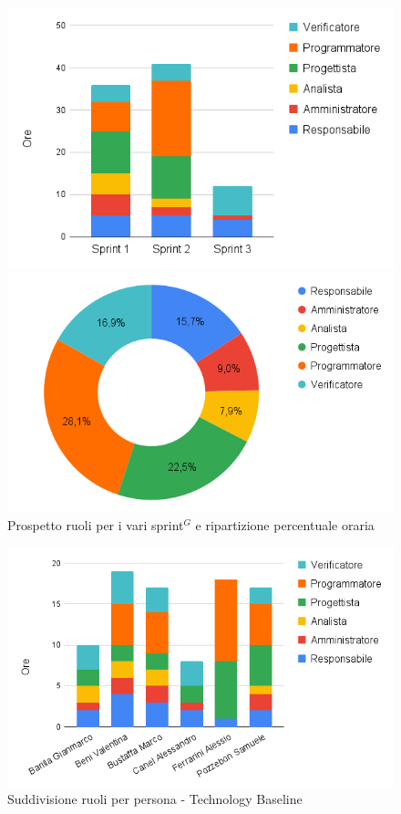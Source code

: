 \begin{figure}[h!]
	\centering
	\begin{minipage}[c]{0.3\textwidth}
    	\includegraphics[scale=0.46]{../../assets/Diagrammi_Excel/sprint_tec.png}
	\end{minipage}
\hfill
	\begin{minipage}[c]{0.46\textwidth}
		\includegraphics[scale=0.37]{../../assets/Diagrammi_Excel/torta_tec.png}
	\end{minipage}
	\caption{Prospetto ruoli per i vari sprint$^{G}$ e ripartizione percentuale oraria}
\end{figure}

\begin{figure}[h!]
	\centering
	\includegraphics[scale=0.47]{../../assets/Diagrammi_Excel/person_tec.png}
	\caption{Suddivisione ruoli per persona - Technology Baseline}
\end{figure}
\newpage

